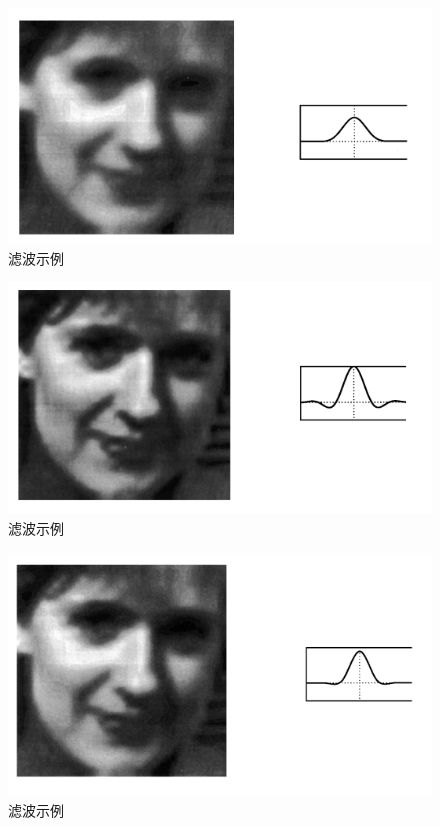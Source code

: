 \begin{CJK}{UTF8}{gbsn}
\begin{figure}[htbp]%
  \centering
  \includegraphics[totalheight=2in]{./fig/1.2.6.png}
  \caption{滤波示例} 
  \label{fig:sinc6}
\end{figure}

\begin{figure}[htbp]%
  \centering
  \includegraphics[totalheight=2in]{./fig/1.2.7.png}
  \caption{滤波示例} 
  \label{fig:sinc7}
\end{figure}

\begin{figure}[htbp]%
  \centering
  \includegraphics[totalheight=2in]{./fig/1.2.8.png}
  \caption{滤波示例} 
  \label{fig:sinc8}
\end{figure}


\end{CJK}

